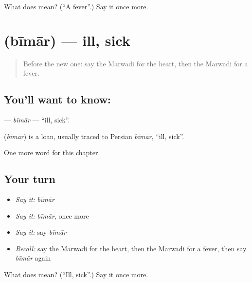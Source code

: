 \begin{tcolorbox}[breakable,colback=teal!4,colframe=teal!35!black,title={Before you move on}]
What does  mean? (\textquotedblleft{}A fever\textquotedblright{}.) Say it once more.
\end{tcolorbox}
\section[\texorpdfstring{\mw{बीमार} (bīmār)}{बीमार (bīmār)}]{ (bīmār) — ill, sick}

\label{lesson:MW-C47-bimar}



\begin{quote}
Before the new one: say the Marwadi for the heart, then the Marwadi for a fever.
\end{quote}

\subsection*{You'll want to know: }
\textbf{} — \emph{bīmār} — \textquotedblleft{}ill, sick\textquotedblright{}.

\begin{cousinweb}
\textbf{} (\emph{bīmār}) is a loan, usually traced to Persian \emph{bīmār}, \textquotedblleft{}ill, sick\textquotedblright{}.
\end{cousinweb}

\begin{grammarlens}[title={What you've built}]
One more word for this chapter.
\end{grammarlens}

\subsection*{Your turn}
\begin{itemize}
\raggedright
  \item \emph{Say it:} \emph{bīmār}
  \item \emph{Say it:} \emph{bīmār}, once more
  \item \emph{Say it:} say \emph{bīmār}
  \item \emph{Recall:} say the Marwadi for the heart, then the Marwadi for a fever, then say \emph{bīmār} again
\end{itemize}

\begin{tcolorbox}[breakable,colback=teal!4,colframe=teal!35!black,title={Before you move on}]
What does  mean? (\textquotedblleft{}Ill, sick\textquotedblright{}.) Say it once more.
\end{tcolorbox}

